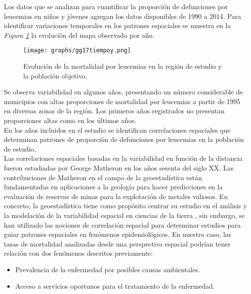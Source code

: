 \documentclass[11pt, oneside]{book}
\begin{document}
Los datos que se analizan para cuantificar la proporción de defunciones por leucemias en niños y jóvenes agregan los datos disponibles de 1990 a 2014. Para identificar variaciones temporales en los patrones espaciales se muestra en la \emph{Figura \ref{fig17.evol}} la evolución del mapa observado por año.\\

\begin{figure}[!ht]
    \centering
    \texttt{[image: graphs/gg17tiempoy.png]}
  \caption{Evolución de la mortalidad por leucemias en la región de estudio y la población objetivo.}
  \label{fig17.evol}
\end{figure}

Se observa variabilidad en algunos años, presentando un número considerable de municipios con altas proporciones de mortalidad por leucemias a partir de 1995 en diversas zonas de la región. Los primeros años registrados no presentan proporciones altas como en los últimos años.\\

En los años incluidos en el estudio se identifican correlaciones espaciales que determinan patrones de proporción de defunciones por leucemias en la población de estudio.\\ 

Las correlaciones espaciales basadas en la variabilidad en función de la distancia fueron estudiadas por George Matheron en los años sesenta del siglo XX. Las contribuciones de Matheron en el campo de la geoestadística están fundamentadas en aplicaciones a la geología para hacer predicciones en la evaluación de reservas de minas para la explotación de metales valiosos. En concreto, la geoestadística tiene como propósito centrar su estudio en el análisis y la modelación de la variabilidad espacial en ciencias de la tierra \cite{cressie}, sin embargo, se han utilizado las nociones de correlación espacial para determinar estudios para guiar patrones espaciales en fenómenos epidemiológicos. En nuestro caso, las tasas de mortalidad analizadas desde una perspectiva espacial podrían tener relación con dos fenómenos descritos previamente:

\begin{itemize}
  \item Prevalencia de la enfermedad por posibles causas ambientales.
  \item Acceso a servicios oportunos para el tratamiento de la enfermedad.
\end{itemize}
\end{document}

